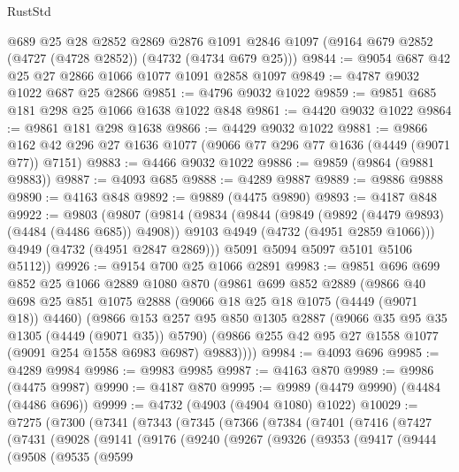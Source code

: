 \begin{lexlean}{RustStd}
\begin{coremodule}
    @689
    @25
    @28
    @2852
    @2869
    @2876
    @1091
    @2846
    @1097
    (@9164 @679 @2852 (@4727 (@4728 @2852)) (@4732 (@4734 @679 @25)))
@9844 := @9054 @687 @42 @25 @27 @2866 @1066 @1077 @1091 @2858 @1097
@9849 := @4787 @9032 @1022 @687 @25 @2866
@9851 := @4796 @9032 @1022
@9859 := @9851 @685 @181 @298 @25 @1066 @1638 @1022 @848
@9861 := @4420 @9032 @1022
@9864 := @9861 @181 @298 @1638
@9866 := @4429 @9032 @1022
@9881 := @9866 @162 @42 @296 @27 @1636 @1077 (@9066 @77 @296 @77 @1636 (@4449 (@9071 @77)) @7151)
@9883 := @4466 @9032 @1022
@9886 := @9859 (@9864 (@9881 @9883))
@9887 := @4093 @685
@9888 := @4289 @9887
@9889 := @9886 @9888
@9890 := @4163 @848
@9892 := @9889 (@4475 @9890)
@9893 := @4187 @848
@9922 := @9803
    (@9807
      (@9814
        (@9834
          (@9844
            (@9849 (@9892 (@4479 @9893) (@4484 (@4486 @685)) @4908))
            @9103
            @4949
            (@4732 (@4951 @2859 @1066)))
          @4949
          (@4732 (@4951 @2847 @2869)))
        @5091
        @5094
        @5097
        @5101
        @5106
        @5112))
@9926 := @9154 @700 @25 @1066 @2891
@9983 := @9851
    @696
    @699
    @852
    @25
    @1066
    @2889
    @1080
    @870
    (@9861
      @699
      @852
      @2889
      (@9866
        @40
        @698
        @25
        @851
        @1075
        @2888
        (@9066 @18 @25 @18 @1075 (@4449 (@9071 @18)) @4460)
        (@9866
          @153
          @257
          @95
          @850
          @1305
          @2887
          (@9066 @35 @95 @35 @1305 (@4449 (@9071 @35)) @5790)
          (@9866 @255 @42 @95 @27 @1558 @1077 (@9091 @254 @1558 @6983 @6987) @9883))))
@9984 := @4093 @696
@9985 := @4289 @9984
@9986 := @9983 @9985
@9987 := @4163 @870
@9989 := @9986 (@4475 @9987)
@9990 := @4187 @870
@9995 := @9989 (@4479 @9990) (@4484 (@4486 @696))
@9999 := @4732 (@4903 (@4904 @1080) @1022)
@10029 := @7275
    (@7300
      (@7341
        (@7343
          (@7345
            (@7366
              (@7384
                (@7401
                  (@7416
                    (@7427
                      (@7431
                        (@9028
                          (@9141
                            (@9176
                              (@9240
                                (@9267
                                  (@9326
                                    (@9353
                                      (@9417
                                        (@9444
                                          (@9508
                                            (@9535
                                              (@9599

\end{coremodule}
\end{lexlean}
